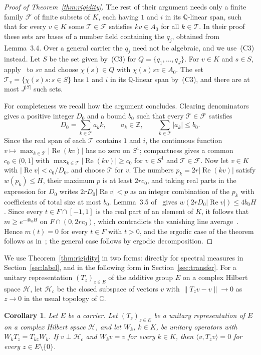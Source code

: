 \documentclass[10pt]{article}
\newtheorem{cor}[thm]{Corollary}
\theoremstyle{remark}
\newcommand{\C}{\mathbb C}
\newcommand{\Q}{\mathbb Q}
\newcommand{\Z}{\mathbb Z}
\newcommand{\calH}{\mathcal H}
\DeclareMathOperator{\re}{Re}
\begin{document}
\begin{proof}[Proof of Theorem~\ref{thm:rigidity}]
The rest of their argument needs only a finite family $\mathcal F$ of finite subsets of $K$, each having $1$ and $i$ in its $\Q$-linear span, such that for every $v\in K$ some $\mathcal T\in\mathcal F$ satisfies $kv\in A_0$ for all $k\in\mathcal T$. In their proof these sets are bases of a number field containing the $q_j$, obtained from Lemma~3.4. Over a general carrier the $q_j$ need not be algebraic, and we use~(C3) instead. Let $S$ be the set given by~(C3) for $Q=\{q_1,\ldots,q_J\}$. For $v\in K$ and $s\in S$, apply~\cite[(3.16)]{OAI} to $sv$ and choose $\chi(s)\in Q$ with $\chi(s)sv\in A_0$. The set $\mathcal T_v=\{\chi(s)s:s\in S\}$ has $1$ and $i$ in its $\Q$-linear span by~(C3), and there are at most $J^{|S|}$ such sets.

For completeness we recall how the argument concludes. Clearing denominators gives a positive integer $D_0$ and a bound $b_0$ such that every $\mathcal T\in\mathcal F$ satisfies
\[
 D_0=\sum_{k\in\mathcal T}a_kk,\qquad a_k\in\Z,\qquad\sum_{k\in\mathcal T}|a_k|\le b_0.
\]
Since the real span of each $\mathcal T$ contains $1$ and $i$, the continuous function $v\mapsto\max_{k\in\mathcal T}|\re(kv)|$ has no zero on $S^1$; compactness gives a common $c_0\in(0,1]$ with $\max_{k\in\mathcal T}|\re(kv)|\ge c_0$ for $v\in S^1$ and $\mathcal T\in\mathcal F$. Now let $v\in K$ with $|\re v|<c_0/D_0$, and choose $\mathcal T$ for $v$. The numbers $p_k=2r|\re(kv)|$ satisfy $w(p_k)\le H$, their maximum $p$ is at least $2rc_0$, and taking real parts in the expression for $D_0$ writes $2rD_0|\re v|<p$ as an integer combination of the $p_k$ with coefficients of total size at most $b_0$. Lemma~3.5 of~\cite{OAI} gives $w(2rD_0|\re v|)\le4b_0H$. Since every $t\in F\cap[-1,1]$ is the real part of an element of $K$, it follows that $m\ge e^{-4b_0H}$ on $F\cap(0,2rc_0)$, which contradicts the vanishing line average~\cite[(2.4)]{OAI}. Hence $m(t)=0$ for every $t\in F$ with $t>0$, and the ergodic case of the theorem follows as in~\cite{OAI}; the general case follows by ergodic decomposition.
\end{proof}

We use Theorem~\ref{thm:rigidity} in two forms: directly for spectral measures in Section~\ref{sec:label}, and in the following form in Section~\ref{sec:transfer}. For a unitary representation $(T_z)_{z\in E}$ of the additive group $E$ on a complex Hilbert space $\calH$, let $\calH_c$ be the closed subspace of vectors $v$ with $\|T_zv-v\|\to0$ as $z\to0$ in the usual topology of $\C$.

\begin{cor}\label{cor:residual}
Let $E$ be a carrier. Let $(T_z)_{z\in E}$ be a unitary representation of $E$ on a complex Hilbert space $\calH$, and let $W_k$, $k\in K$, be unitary operators with $W_kT_z=T_{kz}W_k$. If $v\perp\calH_c$ and $W_kv=v$ for every $k\in K$, then $\langle v,T_zv\rangle=0$ for every $z\in E\setminus\{0\}$.
\end{cor}
\end{document}
